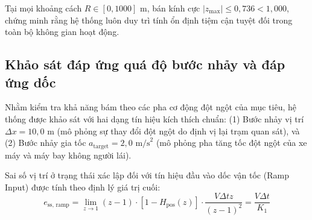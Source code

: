 \begin{table}[H]
\centering
\caption{Vị trí các điểm cực trong miền $Z$ và biên độ dự trữ ổn định theo khoảng cách}
\label{tab:z-domain-stability}
\end{table}

Tại mọi khoảng cách $R \in [0, 1000]$ m, bán kính cực $|z_{\max}| \le 0{,}736 < 1{,}000$, chứng minh rằng hệ thống luôn duy trì tính ổn định tiệm cận tuyệt đối trong toàn bộ không gian hoạt động.

\subsection{Khảo sát đáp ứng quá độ bước nhảy và đáp ứng dốc}

\hspace{0.5cm} Nhằm kiểm tra khả năng bám theo các pha cơ động đột ngột của mục tiêu, hệ thống được khảo sát với hai dạng tín hiệu kích thích chuẩn: (1) Bước nhảy vị trí $\Delta x = 10{,}0$ m (mô phỏng sự thay đổi đột ngột do định vị lại trạm quan sát), và (2) Bước nhảy gia tốc $a_{\text{target}} = 2{,}0\text{ m/s}^2$ (mô phỏng pha tăng tốc đột ngột của xe máy và máy bay không người lái).

Sai số vị trí ở trạng thái xác lập đối với tín hiệu đầu vào dốc vận tốc (Ramp Input) được tính theo định lý giá trị cuối:
\begin{equation}
e_{\text{ss, ramp}} = \lim_{z \to 1} (z-1) \cdot \left[ 1 - H_{\text{pos}}(z) \right] \cdot \frac{V \Delta t z}{(z-1)^2} = \frac{V \Delta t}{K_1}
\label{eq:ramp-steady-state-error}
\end{equation}

